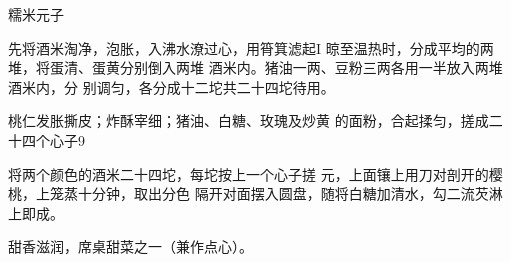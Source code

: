 \begin{recipe}[原珍珠元子]{糯米元子}

\ingredients


\cooking

\step 	先将酒米淘净，泡胀，入沸水潦过心，用筲箕滤起I 晾至温热时，分成平均的两堆，将蛋清、蛋黄分别倒入两堆 酒米内。猪油一两、豆粉三两各用一半放入两堆酒米内，分 别调匀，各分成十二坨共二十四坨待用。

\step 	桃仁发胀撕皮；炸酥宰细；猪油、白糖、玫瑰及炒黄 的面粉，合起揉匀，搓成二十四个心子9

\step 	将两个颜色的酒米二十四坨，每坨按上一个心子搓 元，上面镶上用刀对剖开的樱桃，上笼蒸十分钟，取出分色 隔开对面摆入圆盘，随将白糖加清水，勾二流芡淋上即成。

\notes

甜香滋润，席桌甜菜之一（兼作点心）。

\end{recipe}

